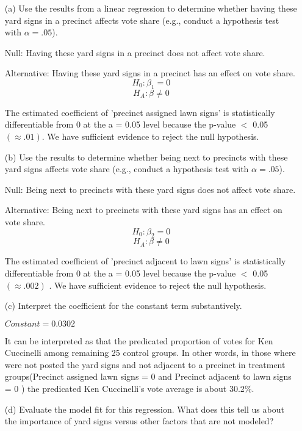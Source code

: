 \documentclass[12pt,letterpaper]{article}
\begin{document}
\vspace{.5cm}
\begin{enumerate}
	\item [(a)] Use the results from a linear regression to determine whether having these yard signs in a precinct affects vote share (e.g., conduct a hypothesis test with $\alpha = .05$).
	
	Null:  Having these yard signs in a precinct does not affect vote share. 
	
	Alternative: Having these yard signs in a precinct has an effect on vote share.
		$$H_0: \beta_1 = 0$$
	$$H_A: \beta \neq 0$$
				  
	\noindent The estimated coefficient of 'precinct assigned lawn signs' is statistically differentiable from 0 at the a = 0.05 level because the p-value $<$ 0.05  $(\approx. 01)$. We have sufficient evidence to reject the null hypothesis.
	\vspace{1cm}
	\item [(b)]  Use the results to determine whether being
	next to precincts with these yard signs affects vote
	share (e.g., conduct a hypothesis test with $\alpha = .05$).
	
	Null:  Being next to precincts with these yard signs does not affect vote share. 
	
	Alternative: Being next to precincts with these yard signs has an effect on vote share.
	$$H_0: \beta_2 = 0$$
	$$H_A: \beta \neq 0$$
				  
	The estimated coefficient of 'precinct adjacent to lawn signs' is statistically differentiable from 0 at the a = 0.05 level because the p-value $<$ 0.05 $(\approx. 002)$ . We have sufficient evidence to reject the null hypothesis.
	\vspace{1cm}
	\item [(c)] Interpret the coefficient for the constant term substantively.
	
	\noindent  $Constant = 0.0302$
	
	It can be interpreted as that the predicated proportion of votes for Ken Cuccinelli among remaining 25 control groups.  In other words, in those where were not posted the yard signs and not adjacent to a precinct in treatment groups(Precinct assigned lawn signs = 0 and Precinct adjacent to lawn signs = 0 ) the predicated Ken Cuccinelli's vote average is about 30.2\%.
	\vspace{1cm}
	
	\item [(d)] Evaluate the model fit for this regression.  What does this	tell us about the importance of yard signs versus other factors that are not modeled?
	

\end{enumerate}
\end{document}
